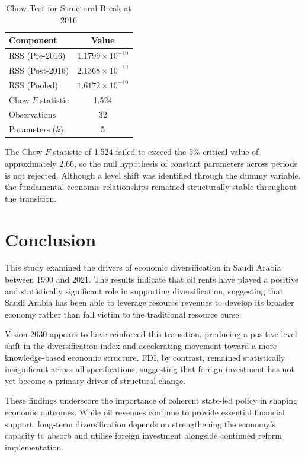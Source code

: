 \documentclass[12pt, a4paper]{article}
\begin{document}
\begin{table}[H]
\centering
\caption{Chow Test for Structural Break at 2016}
\label{tab:chow}
\begin{tabular}{lc}
    \toprule
    \textbf{Component} & \textbf{Value} \\
    \midrule
    RSS (Pre-2016)  & $1.1799 \times 10^{-10}$ \\
    RSS (Post-2016) & $2.1368 \times 10^{-12}$ \\
    RSS (Pooled)    & $1.6172 \times 10^{-10}$ \\
    Chow $F$-statistic & 1.524 \\
    Observations    & 32 \\
    Parameters ($k$) & 5 \\
    \bottomrule
\end{tabular}
\end{table}

The Chow $F$-statistic of 1.524 failed to exceed the 5\% critical value of approximately 2.66, so the null hypothesis of constant parameters across periods is not rejected. Although a level shift was identified through the dummy variable, the fundamental economic relationships remained structurally stable throughout the transition.

\section{Conclusion}

This study examined the drivers of economic diversification in Saudi Arabia between 1990 and 2021. The results indicate that oil rents have played a positive and statistically significant role in supporting diversification, suggesting that Saudi Arabia has been able to leverage resource revenues to develop its broader economy rather than fall victim to the traditional resource curse.

Vision 2030 appears to have reinforced this transition, producing a positive level shift in the diversification index and accelerating movement toward a more knowledge-based economic structure. FDI, by contrast, remained statistically insignificant across all specifications, suggesting that foreign investment has not yet become a primary driver of structural change.

These findings underscore the importance of coherent state-led policy in shaping economic outcomes. While oil revenues continue to provide essential financial support, long-term diversification depends on strengthening the economy's capacity to absorb and utilise foreign investment alongside continued reform implementation.
\end{document}
